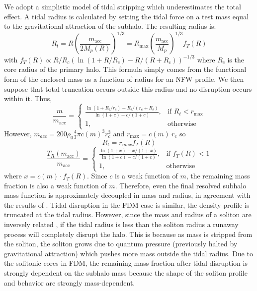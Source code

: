 \documentclass[usenatbib]{mnras}
\begin{document}
	We adopt a simplistic model of tidal stripping which underestimates the total effect. A tidal radius is calculated by setting the tidal force on a test mass equal to the gravitational attraction of the subhalo. The resulting radius is:
\begin{equation}
R_t = R \left(\frac{m_{\text{acc}}}{2M_p(R)}\right)^{1/3} =  R_{\text{max}} \left(\frac{m_{\text{acc}}}{M_p}\right)^{1/3} f_T(R)
\end{equation} 
with $f_T(R) \propto R/R_c(\ln(1+R/R_c) - R/(R+R_c))^{-1/3}$ where $R_c$ is the core radius of the primary halo. This formula simply comes from the functional form of the enclosed mass as a function of radius for an NFW profile. We then suppose that total truncation occurs outside this radius and no disruption occurs within it. Thus,
\begin{equation}
\frac{m}{m_{\text{acc}}} = 
\begin{cases}
\frac{\ln{(1+R_t/r_c)} - R_t/(r_c+R_t)}{\ln{(1+c)} - c/(1+c)},& \text{if } R_t < r_{\text{max}}\\
    1,              & \text{otherwise}
\end{cases}
\end{equation} 
However, $m_{acc} = 200 \rho_0 \frac{4}{3} \pi c(m)^3 r_c^3$ and $r_{\text{max}} = c(m) \: r_{c}$ so 
\begin{equation}
R_t = r_{max} f_T(R)
\end{equation}
\begin{equation} \label{trunc}
\frac{T_R(m_{\text{acc}})}{m_{\text{acc}}} =
\begin{cases}
    \frac{\ln{(1 + x)} - x/(1 + x)}{\ln{(1+c)} - c/(1+c)},& \text{if } f_T(R) < 1\\
    1,              & \text{otherwise}
\end{cases}
\end{equation} 
where $x = c(m) \cdot f_T(R)$. Since $c$ is a weak function of $m$, the remaining mass fraction is also a weak function of $m$. Therefore, even the final resolved subhalo mass function is approximately decoupled in mass and radius, in agreement with the results of \citet{unified_model}. Tidal disruption in the FDM case is similar, the density profile is truncated at the tidal radius. However, since the mass and radius of a soliton are inversely related \citep{solitons}, if the tidal radius is less than the soliton radius a runaway process will completely disrupt the halo. This is because as mass is stripped from the soliton, the soliton grows due to quantum pressure (previously halted by gravitational attraction) which pushes more mass outside the tidal radius. Due to the solitonic cores in FDM, the remaining mass fraction after tidal disruption is strongly dependent on the subhalo mass because the shape of the soliton profile and behavior are strongly mass-dependent. 
\end{document}
